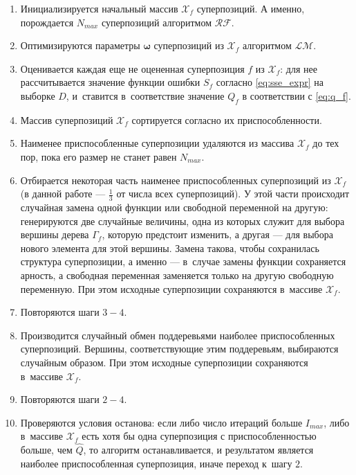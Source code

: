 \documentclass[12pt,a4paper]{amsart}
\begin{document}
\begin{enumerate}
  \item Инициализируется начальный массив $\mathcal{X}_f$ суперпозиций.
	А именно, порождается $N_{max}$ суперпозиций алгоритмом $\mathcal{RF}$.
  \item Оптимизируются параметры $\boldsymbol{\omega}$ суперпозиций
	из $\mathcal{X}_f$ алгоритмом $\mathcal{LM}$.
  \item Оценивается каждая еще не оцененная суперпозиция $f$ из
	$\mathcal{X}_f$: для нее рассчитывается значение функции ошибки $S_f$
	согласно \eqref{eq:sse_expr} на выборке $D$, и~ставится в~соответствие
	значение $Q_f$ в соответствии с \eqref{eq:q_f}.
  \item Массив суперпозиций $\mathcal{X}_f$ сортируется согласно их
	приспособленности.
  \item Наименее приспособленные суперпозиции удаляются из массива
	$\mathcal{X}_f$ до тех пор, пока его размер не станет равен $N_{max}$.
  \item Отбирается некоторая часть наименее приспособленных суперпозиций из
	$\mathcal{X}_f$ (в данной работе --- $\frac{1}{3}$ от числа всех суперпозиций).
	У этой части происходит случайная замена одной функции
	или свободной переменной на другую: генерируются две случайные величины,
	одна из которых служит для выбора вершины дерева $\Gamma_f$, которую
	предстоит изменить, а другая --- для выбора нового элемента для этой вершины.
	Замена такова, чтобы сохранилась структура суперпозиции, а именно ---
	в~случае замены функции сохраняется арность, а свободная переменная
	заменяется только на другую свободную переменную. При этом исходные
	суперпозиции сохраняются в~массиве $\mathcal{X}_f$.
  \item Повторяются шаги $3-4$.
  \item Производится случайный обмен поддеревьями наиболее приспособленных
	суперпозиций. Вершины, соответствующие этим поддеревьям, выбираются
	случайным образом. При этом исходные суперпозиции сохраняются в~массиве
	$\mathcal{X}_f$.
  \item Повторяются шаги $2-4$.
  \item Проверяются условия останова: если либо число итераций больше
	$I_{max}$, либо в~массиве $\mathcal{X}_f$ есть хотя бы одна суперпозиция с
	приспособленностью больше, чем $\hat{Q}$, то алгоритм останавливается,
	и результатом является наиболее приспособленная суперпозиция, иначе
	переход к~шагу $2$.
\end{enumerate}
\end{document}
